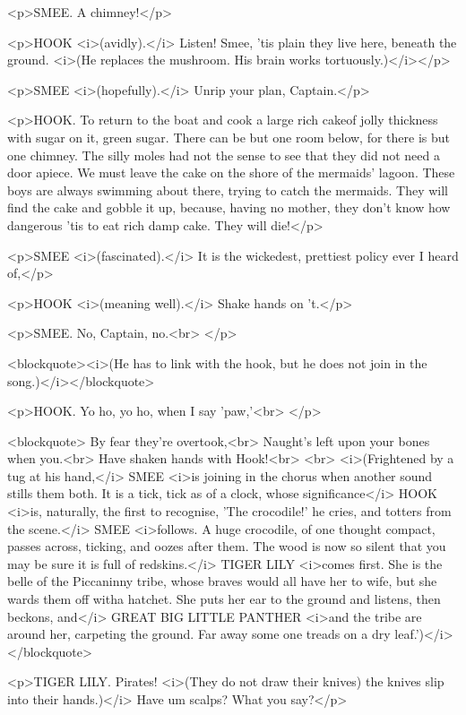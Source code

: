 <p>SMEE. A chimney!</p>

<p>HOOK <i>(avidly).</i> Listen! Smee, 'tis plain they live here,
beneath the ground. <i>(He replaces the mushroom. His brain works
tortuously.)</i></p>

<p>SMEE <i>(hopefully).</i> Unrip your plan, Captain.</p>

<p>HOOK. To return to the boat and cook a large rich cakeof jolly
thickness with sugar on it, green sugar. There can be but one room
below, for there is but one chimney. The silly moles had not the
sense to see that they did not need a door apiece. We must leave the
cake on the shore of the mermaids' lagoon. These boys are always
swimming about there, trying to catch the mermaids. They will find
the cake and gobble it up, because, having no mother, they don't know
how dangerous 'tis to eat rich damp cake. They will die!</p>

<p>SMEE <i>(fascinated).</i> It is the wickedest, prettiest policy
ever I heard of,</p>

<p>HOOK <i>(meaning well).</i> Shake hands on 't.</p>

<p>SMEE. No, Captain, no.<br>
</p>

<blockquote><i>(He has to link with the hook, but he does not join in
the song.)</i></blockquote>

<p>HOOK. Yo ho, yo ho, when I say 'paw,'<br>
</p>

<blockquote>       By fear they're overtook,<br>
       Naught's left upon your bones when you.<br>
       Have shaken hands with Hook!<br>
<br>
 <i>(Frightened by a tug at his hand,</i> SMEE <i>is joining in the
chorus when another sound stills them both. It is a tick, tick as of
a clock, whose significance</i> HOOK <i>is, naturally, the first to
recognise, 'The crocodile!' he cries, and totters from the scene.</i>
SMEE <i>follows. A huge crocodile, of one thought compact, passes
across, ticking, and oozes after them. The wood is now so silent that
you may be sure it is full of redskins.</i> TIGER LILY <i>comes
first. She is the belle of the Piccaninny tribe, whose braves would
all have her to wife, but she wards them off witha hatchet. She puts
her ear to the ground and listens, then beckons, and</i> GREAT BIG
LITTLE PANTHER <i>and the tribe are around her, carpeting the ground.
Far away some one treads on a dry leaf.')</i></blockquote>

<p>TIGER LILY. Pirates! <i>(They do not draw their knives) the knives
slip into their hands.)</i> Have um scalps? What you say?</p>

